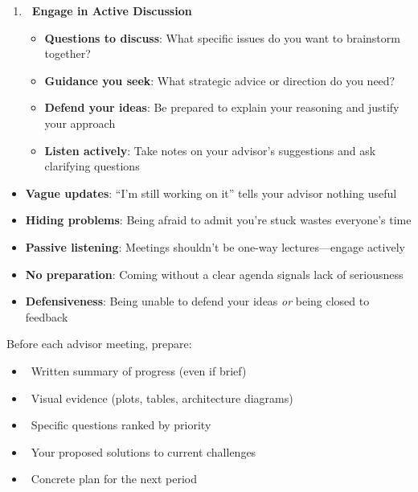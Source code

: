\documentclass[11pt,a4paper]{article}
\begin{document}
\begin{enumerate}[leftmargin=1.5em]
    \item \textbf{\faHandshake~Engage in Active Discussion}
    \begin{itemize}
        \item \textbf{Questions to discuss}: What specific issues do you want to brainstorm together?
        \item \textbf{Guidance you seek}: What strategic advice or direction do you need?
        \item \textbf{Defend your ideas}: Be prepared to explain your reasoning and justify your approach
        \item \textbf{Listen actively}: Take notes on your advisor's suggestions and ask clarifying questions
    \end{itemize}
\end{enumerate}

\begin{tcolorbox}[colback=yellow!5,colframe=orange!60,title={\faExclamationTriangle~Common Pitfalls to Avoid}]
\begin{itemize}
    \item \textbf{Vague updates}: ``I'm still working on it'' tells your advisor nothing useful
    \item \textbf{Hiding problems}: Being afraid to admit you're stuck wastes everyone's time
    \item \textbf{Passive listening}: Meetings shouldn't be one-way lectures—engage actively
    \item \textbf{No preparation}: Coming without a clear agenda signals lack of seriousness
    \item \textbf{Defensiveness}: Being unable to defend your ideas \textit{or} being closed to feedback
\end{itemize}
\end{tcolorbox}

\begin{tcolorbox}[colback=blue!5,colframe=blue!40,title={\faThumbtack~Meeting Preparation Checklist}]
Before each advisor meeting, prepare:
\begin{itemize}
    \item \faFile~Written summary of progress (even if brief)
    \item \faChartLine~Visual evidence (plots, tables, architecture diagrams)
    \item \faQuestionCircle~Specific questions ranked by priority
    \item \faLightbulb~Your proposed solutions to current challenges
    \item \faCalendarCheck~Concrete plan for the next period
\end{itemize}
\end{tcolorbox}
\end{document}
